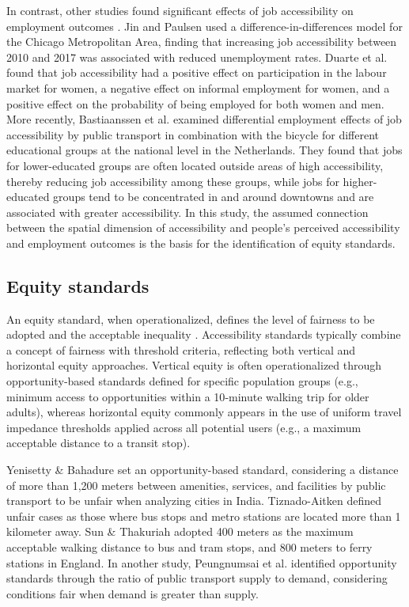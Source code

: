 \documentclass[preprint, 3p,
authoryear]{elsarticle} %
\begin{document}
In contrast, other studies found significant effects of job
accessibility on employment outcomes
\citep{bastiaanssen2021, duarte2023, jin2018, johnson2017, matas2010}.
Jin and Paulsen \citeyearpar{jin2018} used a difference-in-differences
model for the Chicago Metropolitan Area, finding that increasing job
accessibility between 2010 and 2017 was associated with reduced
unemployment rates. Duarte et al. \citeyearpar{duarte2023} found that
job accessibility had a positive effect on participation in the labour
market for women, a negative effect on informal employment for women,
and a positive effect on the probability of being employed for both
women and men. More recently, Bastiaanssen et al.
\citeyearpar{bastiaanssen2025} examined differential employment effects
of job accessibility by public transport in combination with the bicycle
for different educational groups at the national level in the
Netherlands. They found that jobs for lower-educated groups are often
located outside areas of high accessibility, thereby reducing job
accessibility among these groups, while jobs for higher-educated groups
tend to be concentrated in and around downtowns and are associated with
greater accessibility. In this study, the assumed connection between the
spatial dimension of accessibility and people's perceived accessibility
and employment outcomes is the basis for the identification of equity
standards.

\subsection{Equity standards}\label{equity-standards}

An equity standard, when operationalized, defines the level of fairness
to be adopted and the acceptable inequality \citep{soukhov2025a}.
Accessibility standards typically combine a concept of fairness with
threshold criteria, reflecting both vertical and horizontal equity
approaches. Vertical equity is often operationalized through
opportunity‑based standards defined for specific population groups
(e.g., minimum access to opportunities within a 10‑minute walking trip
for older adults), whereas horizontal equity commonly appears in the use
of uniform travel impedance thresholds applied across all potential
users (e.g., a maximum acceptable distance to a transit stop).

Yenisetty \& Bahadure \citeyearpar{yenisetty2020} set an
opportunity-based standard, considering a distance of more than 1,200
meters between amenities, services, and facilities by public transport
to be unfair when analyzing cities in India. Tiznado-Aitken
\citeyearpar{tiznado-aitken2018} defined unfair cases as those where bus
stops and metro stations are located more than 1 kilometer away. Sun \&
Thakuriah \citeyearpar{sun2021} adopted 400 meters as the maximum
acceptable walking distance to bus and tram stops, and 800 meters to
ferry stations in England. In another study, Peungnumsai et al.
\citep{peungnumsai2020} identified opportunity standards through the
ratio of public transport supply to demand, considering conditions fair
when demand is greater than supply.
\end{document}
